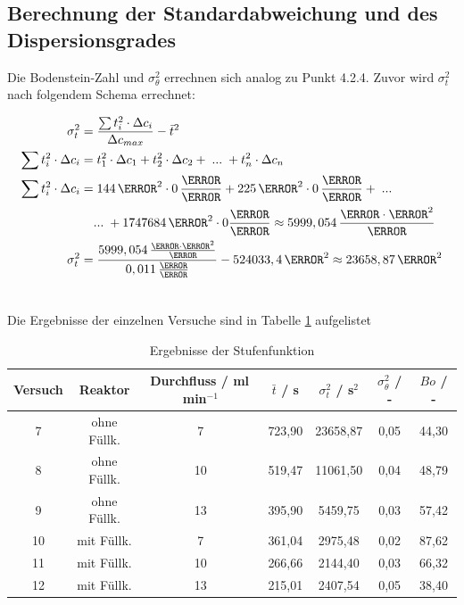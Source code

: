 \documentclass[12pt,liststotoc]{report}
\begin{document}
\newpage
\subsection{Berechnung der Standardabweichung und des Dispersionsgrades}

Die Bodenstein-Zahl und $\sigma_\theta^2$ errechnen sich analog zu Punkt 4.2.4. Zuvor wird $\sigma_t^2$ nach folgendem Schema errechnet: 
 
\begin{align}
\sigma_t^2=&\;\frac{\sum t_i^2\cdot\Delta c_i}{\Delta c_{max}} - \bar{t}^2\\
\sum t_i^2\cdot\Delta c_i =&\;t_1^2\cdot \Delta c_1 + t_2^2\cdot \Delta c_2 +\;...\;+t_n^2\cdot \Delta c_n\\
 \sum t_i^2\cdot\Delta c_i =&\;144\,\s^2 \cdot 0\,\frac{\mole}{\litre} + 225\,\s^2 \cdot 0\,\frac{\mole}{\litre}+\;...\notag\\\notag
&...\;+ 1747684\,\s^2 \cdot 0\frac{\mole}{\litre}\approx 5999,054\,\frac{\mole\cdot\s^2}{\litre}\\\notag
 \sigma_t^2=&\;\frac{5999,054\,\frac{\mole\cdot \s^2}{\litre}}{0,011\,\frac{\mole}{\litre}} - 524033,4\,\s^2 \approx 23658,87\,\s^2\\\notag
\end{align}
\noindent

Die Ergebnisse der einzelnen Versuche sind in Tabelle \ref{tab:werte_step} aufgelistet

\begin{table}[H]
  \centering
  \caption{Ergebnisse der Stufenfunktion}
    \begin{tabular}{ccccccc}
    \toprule
    Versuch & Reaktor & Durchfluss / ml\,min$^{-1}$ & $\bar{t}$ / s & $\sigma_t^2$ / s$^2$ & $\sigma_{\theta}^2$ / - & $Bo$ / - \\
    \midrule
    7     & ohne Füllk. & 7     & 723,90 & 23658,87 & 0,05  & 44,30 \\
    8     & ohne Füllk. & 10    & 519,47 & 11061,50 & 0,04  & 48,79 \\
    9     & ohne Füllk. & 13    & 395,90 & 5459,75 & 0,03  & 57,42 \\
    10    & mit Füllk. & 7     & 361,04 & 2975,48 & 0,02  & 87,62 \\
    11    & mit Füllk. & 10    & 266,66 & 2144,40 & 0,03  & 66,32 \\
    12    & mit Füllk. & 13    & 215,01 & 2407,54 & 0,05  & 38,40 \\
    \bottomrule
    \end{tabular}%

  \label{tab:werte_step}%
\end{table}%
\end{document}
